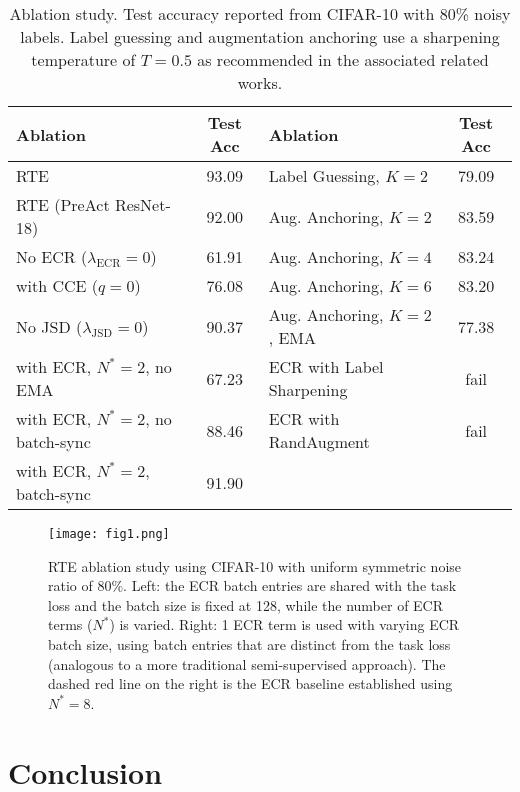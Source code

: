 \documentclass{article}
\DeclareMathOperator{\ECR}{ECR}
\DeclareMathOperator{\JSD}{JSD}
\begin{document}
\begin{table*}\renewcommand{\arraystretch}{1.3}
\centering
\caption{Ablation study.  Test accuracy reported from CIFAR-10 with 80\% noisy labels.  Label guessing \cite{48557} and augmentation anchoring \cite{Berthelot2020ReMixMatch:} use a sharpening temperature of $T=0.5$ as recommended in the associated related works.}\begin{tabular}{lclc}
\toprule
Ablation  & Test Acc & Ablation & Test Acc\\ \hline
RTE                               & 93.09 & Label Guessing, $K=2$          & 79.09  \\
RTE (PreAct ResNet-18) & 92.00 & Aug. Anchoring, $K=2$          & 83.59  \\
No ECR ($\lambda_{\ECR}=0$)       & 61.91 & Aug. Anchoring, $K=4$          & 83.24 \\
with CCE ($q=0$)                  & 76.08 & Aug. Anchoring, $K=6$          & 83.20  \\ 
No JSD ($\lambda_{\JSD}=0$)       & 90.37 & Aug. Anchoring, $K=2$, EMA     & 77.38 \\
with ECR, $N^*=2$, no EMA         & 67.23 & ECR with Label Sharpening      & fail\\
with ECR, $N^*=2$, no batch-sync  & 88.46 & ECR with RandAugment           & fail \\
with ECR, $N^*=2$, batch-sync     & 91.90 \\
\bottomrule
\end{tabular}
\label{tab:ablation_loo}
\end{table*}



\begin{figure*}\centering
  \texttt{[image: fig1.png]}
  \caption{RTE ablation study using CIFAR-10 with uniform symmetric noise ratio of 80\%.  Left: the ECR batch entries are shared with the task loss and the batch size is fixed at 128, while the number of ECR terms ($N^*$) is varied.  Right: 1 ECR term is used with varying ECR batch size, using batch entries that are distinct from the task loss (analogous to a more traditional semi-supervised approach). The dashed red line on the right is the ECR baseline established using $N^* = 8$. }
  \label{fig:ecr_term_batch_size}
\end{figure*}



\section{Conclusion}
\end{document}
